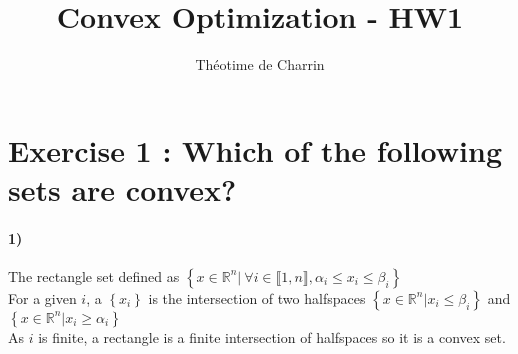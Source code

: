 \documentclass[12pt,a4paper]{article}
\author{Théotime de Charrin}
\title{Convex Optimization - HW1}
\begin{document}
\maketitle
\section{\textbf{Exercise 1} : Which of the following sets are convex?}
\paragraph{1)} The rectangle set defined as 
$ \left\lbrace x \in \mathbb{R}^n | ~\forall i \in  \llbracket 1, n \rrbracket , \alpha_i \leq x_i \leq \beta_i \right\rbrace$ \\
	For a given $i$, a $\left\lbrace x_i\right\rbrace$ is the intersection of two halfspaces $ \left\lbrace x \in \mathbb{R}^n 
| x_i \leq \beta_i \right\rbrace $ and  $\left\lbrace x \in \mathbb{R}^n |  x_i \geq \alpha_i \right\rbrace$ \\
As $i$ is finite, a rectangle is a finite intersection of halfspaces so it is a convex set.
\end{document}
